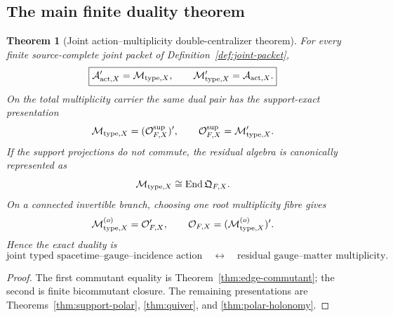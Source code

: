 \documentclass[11pt]{article}
\newtheorem{theorem}{Theorem}[section]
\theoremstyle{definition}
\theoremstyle{remark}
\newcommand{\End}{\operatorname{End}}
\newcommand{\A}{\mathcal A}
\newcommand{\M}{\mathcal M}
\newcommand{\Oalg}{\mathcal O}
\begin{document}
\subsection{The main finite duality theorem}

\begin{theorem}[Joint action--multiplicity double-centralizer theorem]
\label{thm:main-duality}
For every finite source-complete joint packet of
Definition~\ref{def:joint-packet},
\begin{equation}
\boxed{
\A_{{\rm act},X}'
=
\M_{{\rm type},X},
\qquad
\M_{{\rm type},X}'
=
\A_{{\rm act},X}.}
\label{eq:main-duality}
\end{equation}
On the total multiplicity carrier the same dual pair has the support-exact
presentation
\[
\M_{{\rm type},X}
=
(\Oalg_{F,X}^{\rm sup})',
\qquad
\Oalg_{F,X}^{\rm sup}
=
\M_{{\rm type},X}'.
\]
If the support projections do not commute, the residual algebra is
canonically represented as
\[
\M_{{\rm type},X}
\cong
\End\mathfrak Q_{F,X}.
\]
On a connected invertible branch, choosing one root multiplicity fibre gives
\[
\M_{{\rm type},X}^{(o)}
=
\Oalg_{F,X}',
\qquad
\Oalg_{F,X}
=
(\M_{{\rm type},X}^{(o)})'.
\]
Hence the exact duality is
\begin{equation}
\boxed{
\text{joint typed spacetime--gauge--incidence action}
\quad\longleftrightarrow\quad
\text{residual gauge--matter multiplicity}.}
\label{eq:dual-pair-words}
\end{equation}
\end{theorem}

\begin{proof}
The first commutant equality is Theorem~\ref{thm:edge-commutant}; the second is
finite bicommutant closure.  The remaining presentations are
Theorems~\ref{thm:support-polar}, \ref{thm:quiver}, and
\ref{thm:polar-holonomy}.
\end{proof}
\end{document}
